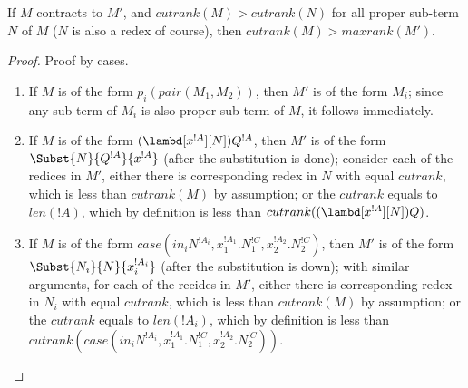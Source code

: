 \documentclass[../../../include/open-logic-section]{subfiles}
\begin{document}
\begin{lem}
  If $M$ contracts to $M'$, and $cutrank(M) > cutrank(N)$ for all 
  proper sub-term $N$ of $M$ ($N$ is also a redex of course), then
  $cutrank(M) > maxrank(M')$.
\end{lem}
\begin{proof}
  Proof by cases.
  \begin{enumerate}
  \item
    If $M$ is of the form $p_i(pair(M_1, M_2))$, then $M'$ is of the
    form $M_i$; since any sub-term of $M_i$ is also proper sub-term of $M$,
    it follows immediately.

  \item
    If $M$ is of the form $(\lambd[x^{!A}][N])Q^{!A}$, then $M'$ is of the form
    $\Subst{N}{Q^{!A}}{x^{!A}}$ (after the substitution is done); consider each of
    the redices in $M'$, either there is corresponding redex in $N$ with
    equal $cutrank$, which is less than $cutrank(M)$ by assumption; or the $cutrank$ equals to $len(!A)$, which by
    definition is less than $cutrank((\lambd[x^{!A}][N])Q)$.
    
  \item
    If $M$ is of the form $case(in_i N^{!A_i}, x_1^{!A_1}.N_1^{!C}, x_2^{!A_2}.N_2^{!C})$, then $M'$ is
    of the form $\Subst{N_i}{N}{x_i^{!A_i}}$ (after the substitution is
    down); with similar arguments, for each of the recides in $M'$,
    either there is corresponding redex in $N_i$ with equal $cutrank$,
    which is less than $cutrank(M)$ by assumption; or the $cutrank$
    equals to $len(!A_i)$, which by definition is less than
    $cutrank(case(in_i N^{!A_i}, x_1^{!A_1}.N_1^{!C},
    x_2^{!A_2}.N_2^{!C}))$.
  \end{enumerate}
\end{proof}
\end{document}
